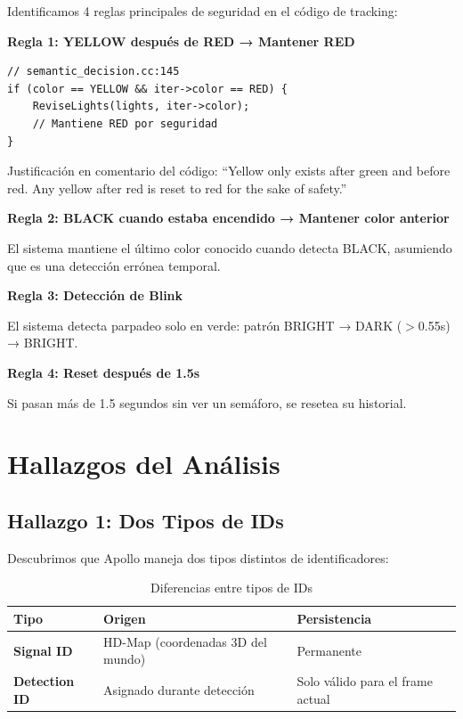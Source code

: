 Identificamos 4 reglas principales de seguridad en el código de tracking:

\textbf{Regla 1: YELLOW después de RED → Mantener RED}

\begin{codesnippet}
\begin{verbatim}
// semantic_decision.cc:145
if (color == YELLOW && iter->color == RED) {
    ReviseLights(lights, iter->color);
    // Mantiene RED por seguridad
}
\end{verbatim}
\end{codesnippet}

Justificación en comentario del código: ``Yellow only exists after green and before red. Any yellow after red is reset to red for the sake of safety.''

\textbf{Regla 2: BLACK cuando estaba encendido → Mantener color anterior}

El sistema mantiene el último color conocido cuando detecta BLACK, asumiendo que es una detección errónea temporal.

\textbf{Regla 3: Detección de Blink}

El sistema detecta parpadeo solo en verde: patrón BRIGHT → DARK ($>$0.55s) → BRIGHT.

\textbf{Regla 4: Reset después de 1.5s}

Si pasan más de 1.5 segundos sin ver un semáforo, se resetea su historial.

\section{Hallazgos del Análisis}

\subsection{Hallazgo 1: Dos Tipos de IDs}

Descubrimos que Apollo maneja dos tipos distintos de identificadores:

\begin{table}[H]
\centering
\begin{tabular}{|l|p{5cm}|p{5cm}|}
\hline
\textbf{Tipo} & \textbf{Origen} & \textbf{Persistencia} \\
\hline
\textbf{Signal ID} & HD-Map (coordenadas 3D del mundo) & Permanente \\
\hline
\textbf{Detection ID} & Asignado durante detección & Solo válido para el frame actual \\
\hline
\end{tabular}
\caption{Diferencias entre tipos de IDs}
\end{table}

